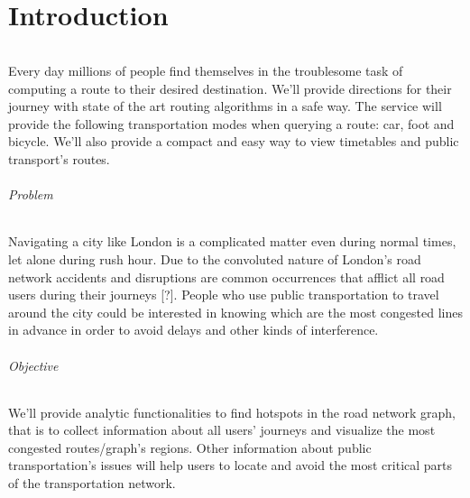 \part{Introduction}

\paragraph{}
Every day millions of people find themselves in the troublesome task of 
computing a route to their desired destination. We'll provide directions for 
their journey with state of the art routing algorithms in a safe way. The 
service will provide the following transportation modes when querying a route: 
car, foot and bicycle. We’ll also provide a compact and easy way to view 
timetables and public transport’s routes.

\paragraph{Problem}
Navigating a city like London is a complicated matter even during normal times, 
let alone during rush hour. Due to the convoluted nature of London’s road 
network accidents and disruptions are common occurrences that afflict all road 
users during their journeys [?]. People who use public transportation to travel 
around the city could be interested in knowing which are the most congested 
lines in advance in order to avoid delays and other kinds of interference.

\paragraph{Objective}
We’ll provide analytic functionalities to find hotspots in the road network 
graph, that is to collect information about all users’ journeys and visualize 
the most congested routes/graph’s regions. Other information about public 
transportation’s issues will help users to locate and avoid the most critical 
parts of the transportation network.
